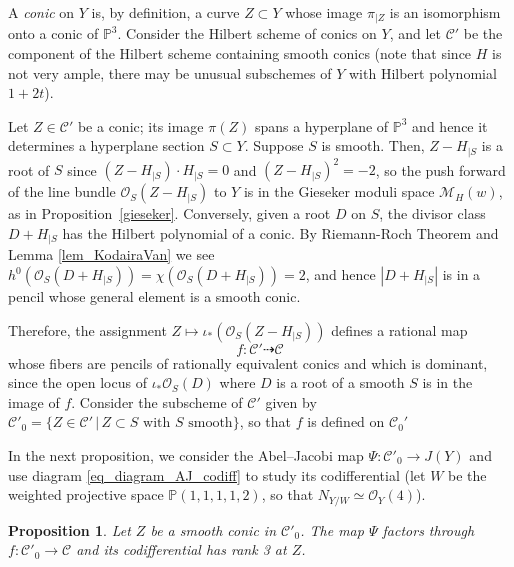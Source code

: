 \documentclass[11pt]{amsart}
\newtheorem{proposition}[thm]{Proposition}
\theoremstyle{definition}
\newcommand{\pr}[1]{\mathbb P^{#1}}
\newcommand{\sO}{\mathcal{O}}
\newcommand{\sM}{\mathcal{M}}
\newcommand{\sC}{\mathcal{C}}
\newcommand{\AAA}[1]{\textcolor{red}{#1}}
\begin{document}
A \textit{conic} on $Y$ is, by definition, a curve $Z\subset Y$ whose image $\pi_{|Z}$ is an isomorphism onto a conic of $\pr 3$. Consider the Hilbert scheme of conics on $Y$, and let $\sC'$ be the component of the Hilbert scheme containing smooth conics (note that since $H$ is not very ample, there may be unusual subschemes of $Y$ with Hilbert polynomial $1+2t$). 

Let $Z\in\sC'$ be a conic;  its image $\pi(Z)$ spans a hyperplane of $\pr 3$ and hence it determines a  hyperplane section $S\subset Y$. Suppose $S$ is smooth. Then, $Z-H_{|S}$ is a root of $S$ since $(Z-H_{|S})\cdot H_{|S}=0$ and $(Z-H_{|S})^2=-2$, so the push forward of the line bundle $\sO_S(Z-H_{|S})$ to $Y$ is in the Gieseker moduli space $\sM_H(w)$, as in Proposition~\ref{gieseker}.
Conversely, given a root $D$ on $S$, the divisor class $D+H_{|S}$ has the Hilbert polynomial of a conic. By Riemann-Roch Theorem and Lemma \ref{lem_KodairaVan}  we see $h^0(\sO_S(D+H_{|S}))=\chi(\sO_S(D+H_{|S}))=2$, and hence $|D+H_{|S}|$ is in a pencil whose general element is a smooth conic. 

Therefore, the assignment $Z\mapsto \iota_*(\sO_S(Z-H_{|S}))$ defines a rational map 
\[ f\colon \sC' \dashrightarrow \sC \]
whose fibers are pencils of rationally equivalent conics %
and which is dominant, since the open locus of $\iota_*\sO_S(D)$ where $D$ is a root of a smooth $S$ is in the image of $f$.
Consider the subscheme of $\sC'$ given by $\sC'_0=\{Z\in \sC' \,|\,Z\subset S\text{ with $S$ smooth}\}$, so that $f$ is defined on $\sC_0'$ 

In the next proposition, we consider the Abel--Jacobi map $\Psi\colon\sC'_0\to J(Y)$ and use diagram \eqref{eq_diagram_AJ_codiff} to study its codifferential (let $W$ be the weighted projective space $\mathbb{P}(1,1,1,1,2)$, so that $N_{Y/W}\simeq \sO_Y(4)$).

\begin{proposition}
\label{prop_AJ_factorsThroughC}
Let $Z$ be a smooth conic in $\sC'_0$. The map $\Psi$ factors through $f\colon\sC'_0\to \sC$ and its codifferential has rank 3 at $Z$.
\end{proposition}
\end{document}
